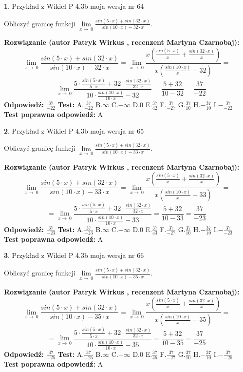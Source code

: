 \documentclass[12pt, a4paper]{article}
\theoremstyle{definition} %
\newtheorem{zad}{}
\newcommand{\zadStart}[1]{\begin{zad}#1\newline}
\newcommand{\zadStop}{\end{zad}}
\newcommand{\rozwStart}[2]{\noindent \textbf{Rozwiązanie (autor #1 , recenzent #2): }\newline}
\newcommand{\rozwStop}{\newline}
\newcommand{\odpStart}{\noindent \textbf{Odpowiedź:}\newline}
\newcommand{\odpStop}{\newline}
\newcommand{\testStart}{\noindent \textbf{Test:}\newline}
\newcommand{\testStop}{\newline}
\newcommand{\kluczStart}{\noindent \textbf{Test poprawna odpowiedź:}\newline}
\newcommand{\kluczStop}{\newline}
\begin{document}
\zadStart{Przykład z Wikieł P 4.3b moja wersja nr 64}


Obliczyć granicę funkcji $\lim\limits_{x\to\ 0}\frac{sin(5 \cdot x)+sin(32 \cdot x)}{sin(10 \cdot x)-32 \cdot x}$.
\zadStop
\rozwStart{Patryk Wirkus}{Martyna Czarnobaj}
$$\lim\limits_{x\to\ 0}\frac{sin(5 \cdot x)+sin(32 \cdot x)}{sin(10 \cdot x)-32 \cdot x}=\lim\limits_{x\to\ 0}\frac{x(\frac{sin(5 \cdot x)}{x}+\frac{sin(32 \cdot x)}{x})}{x(\frac{sin(10 \cdot x)}{x}-32)}=$$
$$=\lim\limits_{x\to\ 0}\frac{5 \cdot \frac{sin(5 \cdot x)}{5 \cdot x}+32 \cdot \frac{sin(32 \cdot x)}{32 \cdot x}}{10 \cdot \frac{sin(10 \cdot x)}{10 \cdot x}-32}=\frac{5+32}{10-32} = \frac{37}{-22}$$
\rozwStop
\odpStart
$\frac{37}{-22}$
\odpStop
\testStart
A.$\frac{37}{-22}$
B.$\infty$
C.$-\infty$
D.$0$
E.$\frac{37}{42}$
F.$\frac{37}{-27}$
G.$\frac{37}{10}$
H.$-\frac{37}{10}$
I.$-\frac{37}{-22}$
\testStop
\kluczStart
A
\kluczStop



\zadStart{Przykład z Wikieł P 4.3b moja wersja nr 65}


Obliczyć granicę funkcji $\lim\limits_{x\to\ 0}\frac{sin(5 \cdot x)+sin(32 \cdot x)}{sin(10 \cdot x)-33 \cdot x}$.
\zadStop
\rozwStart{Patryk Wirkus}{Martyna Czarnobaj}
$$\lim\limits_{x\to\ 0}\frac{sin(5 \cdot x)+sin(32 \cdot x)}{sin(10 \cdot x)-33 \cdot x}=\lim\limits_{x\to\ 0}\frac{x(\frac{sin(5 \cdot x)}{x}+\frac{sin(32 \cdot x)}{x})}{x(\frac{sin(10 \cdot x)}{x}-33)}=$$
$$=\lim\limits_{x\to\ 0}\frac{5 \cdot \frac{sin(5 \cdot x)}{5 \cdot x}+32 \cdot \frac{sin(32 \cdot x)}{32 \cdot x}}{10 \cdot \frac{sin(10 \cdot x)}{10 \cdot x}-33}=\frac{5+32}{10-33} = \frac{37}{-23}$$
\rozwStop
\odpStart
$\frac{37}{-23}$
\odpStop
\testStart
A.$\frac{37}{-23}$
B.$\infty$
C.$-\infty$
D.$0$
E.$\frac{37}{43}$
F.$\frac{37}{-27}$
G.$\frac{37}{10}$
H.$-\frac{37}{10}$
I.$-\frac{37}{-23}$
\testStop
\kluczStart
A
\kluczStop



\zadStart{Przykład z Wikieł P 4.3b moja wersja nr 66}


Obliczyć granicę funkcji $\lim\limits_{x\to\ 0}\frac{sin(5 \cdot x)+sin(32 \cdot x)}{sin(10 \cdot x)-35 \cdot x}$.
\zadStop
\rozwStart{Patryk Wirkus}{Martyna Czarnobaj}
$$\lim\limits_{x\to\ 0}\frac{sin(5 \cdot x)+sin(32 \cdot x)}{sin(10 \cdot x)-35 \cdot x}=\lim\limits_{x\to\ 0}\frac{x(\frac{sin(5 \cdot x)}{x}+\frac{sin(32 \cdot x)}{x})}{x(\frac{sin(10 \cdot x)}{x}-35)}=$$
$$=\lim\limits_{x\to\ 0}\frac{5 \cdot \frac{sin(5 \cdot x)}{5 \cdot x}+32 \cdot \frac{sin(32 \cdot x)}{32 \cdot x}}{10 \cdot \frac{sin(10 \cdot x)}{10 \cdot x}-35}=\frac{5+32}{10-35} = \frac{37}{-25}$$
\rozwStop
\odpStart
$\frac{37}{-25}$
\odpStop
\testStart
A.$\frac{37}{-25}$
B.$\infty$
C.$-\infty$
D.$0$
E.$\frac{37}{45}$
F.$\frac{37}{-27}$
G.$\frac{37}{10}$
H.$-\frac{37}{10}$
I.$-\frac{37}{-25}$
\testStop
\kluczStart
A
\kluczStop
\end{document}
